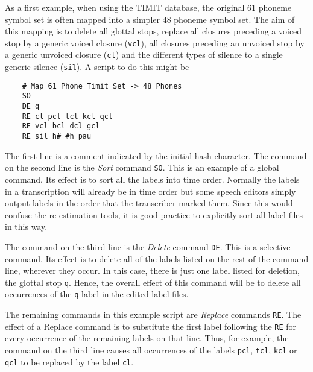 As a first example, when using the 
TIMIT database,  
the original 61 phoneme symbol set is often mapped
into a simpler 48 phoneme symbol set.  The aim of this mapping
is to delete all glottal stops, replace all closures preceding a voiced stop 
by a generic
voiced closure (\texttt{vcl}), all closures preceding an unvoiced stop 
by a generic
unvoiced closure (\texttt{cl}) and the different types of silence to
a single generic silence (\texttt{sil}).  A  script to
do this might be
\begin{verbatim}
    # Map 61 Phone Timit Set -> 48 Phones
    SO
    DE q
    RE cl pcl tcl kcl qcl
    RE vcl bcl dcl gcl
    RE sil h# #h pau
\end{verbatim}
The first line is a comment indicated by the initial hash character.
The command on the second line is the {\it Sort} command 
\texttt{SO}.
This is an example of a global command.
Its effect is to sort all the labels into time order.
Normally the labels in a transcription will already be in time order
but some speech editors simply output labels in the order that the
transcriber marked them.  Since this would confuse the re-estimation
tools, it is good practice to explicitly sort all label files in this
way.

The command on the third line is the {\it Delete} command 
\texttt{DE}.  
This is
a selective command.  Its
effect is to delete all of the labels
listed on the rest of the command line, wherever they occur.
In this case, there is
just one label listed for deletion, the
glottal stop  \texttt{q}.
Hence, the overall effect of this command will be to delete all occurrences
of the \texttt{q} label in the edited label files.

The remaining commands in this example script are {\it Replace} commands
\texttt{RE}.  The effect of a Replace command is to substitute the first
label following the \texttt{RE} for every occurrence of the remaining labels
on that line.  Thus, for example, the 
command on the third line causes all occurrences of the labels \texttt{pcl},
\texttt{tcl}, \texttt{kcl} or \texttt{qcl} to be replaced by the label \texttt{cl}.


